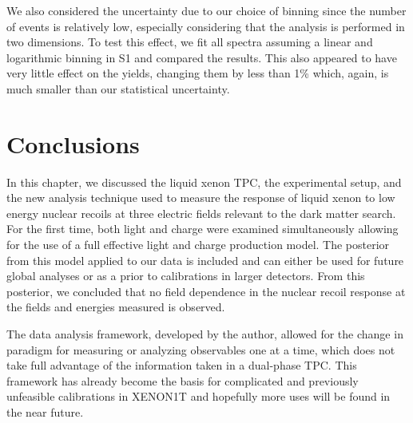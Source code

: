  We also considered the uncertainty due to our choice of binning since the number of events is relatively low, especially considering that the analysis is performed in two dimensions.  To test this effect, we fit all spectra assuming a linear and logarithmic binning in S1 and compared the results.  This also appeared to have very little effect on the yields, changing them by less than 1\% which, again, is much smaller than our statistical uncertainty.  



\section{Conclusions}


In this chapter, we discussed the liquid xenon TPC, the experimental setup, and the new analysis technique used to measure the response of liquid xenon to low energy nuclear recoils at three electric fields relevant to the dark matter search.  For the first time, both light and charge were examined simultaneously allowing for the use of a full effective light and charge production model.  The posterior from this model applied to our data is included and can either be used for future global analyses or as a prior to calibrations in larger detectors.  From this posterior, we concluded that no field dependence in the nuclear recoil response at the fields and energies measured is observed.

The data analysis framework, developed by the author, allowed for the change in paradigm for measuring or analyzing observables one at a time, which does not take full advantage of the information taken in a dual-phase TPC.  This framework has already become the basis for complicated and previously unfeasible calibrations in XENON1T and hopefully more uses will be found in the near future.





